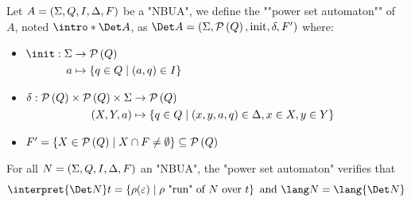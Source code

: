 \documentclass[twoside]{article}
\begin{document}
\begin{definition}
	Let $A = (\Sigma, Q, I, \Delta, F)$ be a "NBUA", we define the ""power set automaton"" of $A$, noted $\intro* \Det A$, as
	$\Det A = (\Sigma, \parts Q, \text{init}, \delta, F')$ where:

	\begin{itemize}
		\item $\begin{aligned}[t]
				      \init      : \Sigma & \to \parts Q                          \\
				      a                   & \mapsto \setdef{q \in Q}{(a,q) \in I}
			      \end{aligned} $

		\item $\begin{aligned}[t]
				      \delta               : \mathcal{P}\left(Q\right) \times \mathcal{P}\left(Q\right) \times \Sigma & \to \mathcal{P}\left(Q\right)                                                     \\
				      (X, Y, a)                                                     & \mapsto \left\{q \in Q \mid (x,y,a,q) \in \Delta, x \in X, y \in Y\right\}
			      \end{aligned}$

		\item $F' = \left\{X \in \mathcal{P}\left(Q\right) \mid X \cap F \neq \emptyset\right\} \subseteq \mathcal{P}\left(Q\right)$
	\end{itemize}
\end{definition}

\begin{theorem}
	For all $N = (\Sigma, Q, I, \Delta, F)$ an "NBUA", the "power set automaton" verifies that
	\[
		\interpret {\Det N} t = \setdef {\rho(\varepsilon)}{\text{$\rho$ "run" of~$N$ over~$t$}} \text{ and } \lang N = \lang {\Det N}
	\]
\end{theorem}
\end{document}
